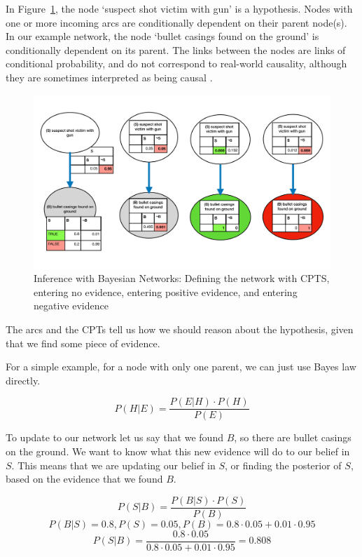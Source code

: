 \documentclass[12pt]{article}
\begin{document}
In Figure~\ref{exampleBN}, the node `suspect shot victim with gun' is a hypothesis. Nodes with one or more incoming arcs are conditionally dependent on their parent node(s). In our example network, the node `bullet casings found on the ground' is conditionally dependent on its parent. The links between the nodes are links of conditional probability, and do not correspond to real-world causality, although they are sometimes interpreted as being causal \citep{Dawid2008}.

\begin{figure}[htbp]
\begin{center}
\includegraphics[width=\linewidth]{images/basicBayes}
\caption{Inference with Bayesian Networks: Defining the network with CPTS, entering no evidence, entering positive evidence, and entering negative evidence}
\label{exampleBN}
\end{center}
\end{figure}


The arcs and the CPTs tell us how we should reason about the hypothesis, given that we find some piece of evidence.


For a simple example, for a node with only one parent, we can just use Bayes law directly.


\[ P(H | E) =  \frac{P(E | H) \cdot P(H)}{P(E)}\]




To update to our network let us say that we found $B$, so there are bullet casings on the ground. We want to know what this new evidence will do to our belief in $S$. This means that we are updating our belief in $S$, or finding the posterior of $S$, based on the evidence that we found $B$.

\[ P(S | B) =  \frac{P(B | S) \cdot P(S)}{P(B)}\]
\[ P(B | S) = 0.8, P(S) = 0.05, P(B) = 0.8 \cdot 0.05 + 0.01 \cdot 0.95\]
\[ P(S | B) =  \frac{0.8 \cdot 0.05}{0.8 \cdot 0.05 + 0.01 \cdot 0.95} = 0.808\]
\end{document}
